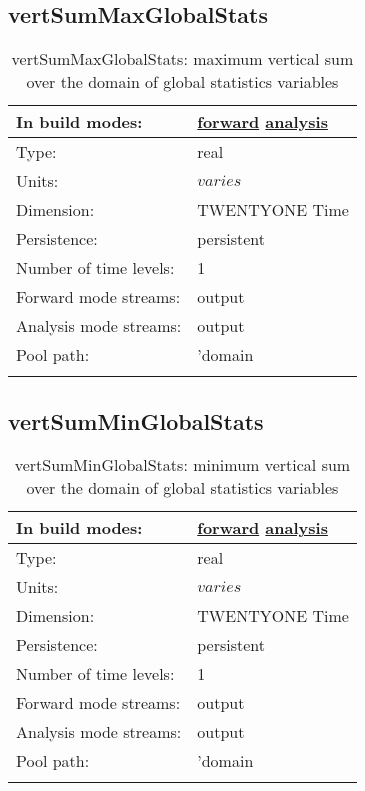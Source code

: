 \subsection[vertSumMaxGlobalStats]{vertSumMaxGlobalStats}
\label{subsec:var_sec_amGlobalStats_vertSumMaxGlobalStats}
\begin{center}
\begin{longtable}{| p{2.0in} | p{4.0in} |}
        \hline 
        In build modes: & \hyperref[subsec:forward_var_tab_amGlobalStats]{forward} \hyperref[subsec:analysis_var_tab_amGlobalStats]{analysis} \\
        \hline 
        Type: & real \\
        \hline 
        Units: & $varies$ \\
        \hline 
        Dimension: & TWENTYONE Time \\
        \hline 
        Persistence: & persistent \\
        \hline 
        Number of time levels: & 1 \\
        \hline 
		 Forward mode streams: &  output \\
        \hline 
		 Analysis mode streams: &  output \\
        \hline 
            Pool path: & 'domain %
 \\
		 \hline 
    \caption{vertSumMaxGlobalStats: maximum vertical sum over the domain of global statistics variables}
\end{longtable}
\end{center}
\subsection[vertSumMinGlobalStats]{vertSumMinGlobalStats}
\label{subsec:var_sec_amGlobalStats_vertSumMinGlobalStats}
\begin{center}
\begin{longtable}{| p{2.0in} | p{4.0in} |}
        \hline 
        In build modes: & \hyperref[subsec:forward_var_tab_amGlobalStats]{forward} \hyperref[subsec:analysis_var_tab_amGlobalStats]{analysis} \\
        \hline 
        Type: & real \\
        \hline 
        Units: & $varies$ \\
        \hline 
        Dimension: & TWENTYONE Time \\
        \hline 
        Persistence: & persistent \\
        \hline 
        Number of time levels: & 1 \\
        \hline 
		 Forward mode streams: &  output \\
        \hline 
		 Analysis mode streams: &  output \\
        \hline 
            Pool path: & 'domain %
 \\
		 \hline 
    \caption{vertSumMinGlobalStats: minimum vertical sum over the domain of global statistics variables}
\end{longtable}
\end{center}
